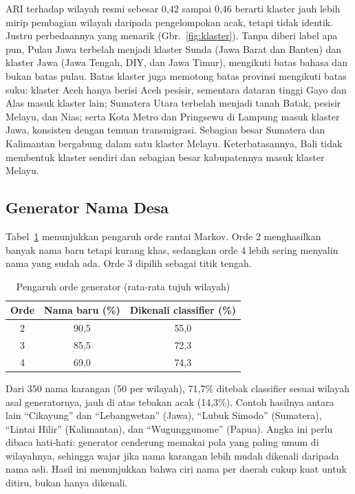 \documentclass[conference]{IEEEtran}
\begin{document}
ARI terhadap wilayah resmi sebesar 0,42 sampai 0,46 berarti klaster jauh lebih mirip pembagian wilayah daripada pengelompokan acak, tetapi tidak identik. Justru perbedaannya yang menarik (Gbr.~\ref{fig:klaster}). Tanpa diberi label apa pun, Pulau Jawa terbelah menjadi klaster Sunda (Jawa Barat dan Banten) dan klaster Jawa (Jawa Tengah, DIY, dan Jawa Timur), mengikuti batas bahasa dan bukan batas pulau. Batas klaster juga memotong batas provinsi mengikuti batas suku: klaster Aceh hanya berisi Aceh pesisir, sementara dataran tinggi Gayo dan Alas masuk klaster lain; Sumatera Utara terbelah menjadi tanah Batak, pesisir Melayu, dan Nias; serta Kota Metro dan Pringsewu di Lampung masuk klaster Jawa, konsisten dengan temuan transmigrasi. Sebagian besar Sumatera dan Kalimantan bergabung dalam satu klaster Melayu. Keterbatasannya, Bali tidak membentuk klaster sendiri dan sebagian besar kabupatennya masuk klaster Melayu.

\subsection{Generator Nama Desa}

Tabel~\ref{tab:orde} menunjukkan pengaruh orde rantai Markov. Orde 2 menghasilkan banyak nama baru tetapi kurang khas, sedangkan orde 4 lebih sering menyalin nama yang sudah ada. Orde 3 dipilih sebagai titik tengah.

\begin{table}[!t]
\caption{Pengaruh orde generator (rata-rata tujuh wilayah)}
\label{tab:orde}
\centering
\begin{tabular}{ccc}
\toprule
Orde & Nama baru (\%) & Dikenali classifier (\%) \\
\midrule
2 & 90,5 & 55,0 \\
3 & 85,5 & 72,3 \\
4 & 69,0 & 74,3 \\
\bottomrule
\end{tabular}
\end{table}

Dari 350 nama karangan (50 per wilayah), 71,7\% ditebak classifier sesuai wilayah asal generatornya, jauh di atas tebakan acak (14,3\%). Contoh hasilnya antara lain ``Cikayung'' dan ``Lebangwetan'' (Jawa), ``Lubuk Simodo'' (Sumatera), ``Lintai Hilir'' (Kalimantan), dan ``Wugunggunome'' (Papua). Angka ini perlu dibaca hati-hati: generator cenderung memakai pola yang paling umum di wilayahnya, sehingga wajar jika nama karangan lebih mudah dikenali daripada nama asli. Hasil ini menunjukkan bahwa ciri nama per daerah cukup kuat untuk ditiru, bukan hanya dikenali.
\end{document}
